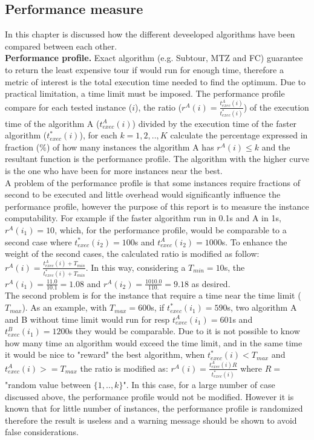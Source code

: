 \documentclass[10pt, english, openany]{report}
\begin{document}
\begin{appendices}
		\chapter{Performance measure} \label{sec:performance_meausure}
			In this chapter is discussed how the different deveeloped algorithms have been compared between each other.\\
			\textbf{Performance profile.} Exact algorithm (e.g. Subtour, MTZ and FC) guarantee to return the least expensive tour if would run for enough time, therefore a metric of interest is the total execution time needed to find the optimum. 
			Due to practical limitation, a time limit must be imposed. The performance profile compare for each tested instance ($ i $), the ratio ($ r^A(i) = \frac{t_{exec}^A(i)}{t_{exec}^*(i)} $) of the execution time of the algorithm A ($ t_{exec}^A(i) $) divided by the execution time of the faster algorithm ($ t_{exec}^*(i) $), for each $ k = 1, 2, .., K $ calculate the percentage expressed in fraction ($ \% $) of how many instances the algorithm A has $ r^A(i) \le k $ and the resultant function is the performance profile.
			The algorithm with the higher curve is the one who have been for more instances near the best.\\
			A problem of the performance profile is that some instances require fractions of second to be executed and little overhead would significantly influence the performance profile, however the purpose of this report is to measure the instance computability. For example if the faster algorithm run in 0.1s and A in 1s, $ r^A(i_1) = 10 $, which, for the performance profile, would be comparable to a second case where $ t_{exec}^*(i_2) = 100 $s and $ t_{exec}^A(i_2) = 1000 $s. To enhance the weight of the second cases, the calculated ratio is modified as follow: $ r^A(i) = \frac{t_{exec}^A(i)+T_{min}}{t_{exec}^*(i)+T_{min}} $. In this way, considering a $ T_{min} = 10$s, the $ r^A(i_1) = \frac{11.0}{10.1} = 1.08 $ and $ r^A(i_2) = \frac{1010.0}{110.} = 9.18 $ as desired.\\
			The second problem is for the instance that require a time near the time limit ($ T_{max} $). As an example, with $ T_{max} = 600 $s, if $ t_{exec}^*(i_1) = 590$s, two algorithm A and B without time limit would run for resp $ t_{exec}^A(i_1) = 601$s and $ t_{exec}^B(i_1) = 1200$s they would be comparable. Due to it is not possible to know how many time an algorithm would exceed the time limit, and in the same time it would be nice to "reward" the best algorithm, when $ t_{exec}^*(i) < T_{max} $ and $ t_{exec}^A(i) >= T_{max} $ the ratio is modified as:  $ r^A(i) = \frac{t_{exec}^A(i)R}{t_{exec}^*(i)} $ where $ R = $ "random value between $ \{1,..,k\} $". In this case, for a large number of case discussed above, the performance profile would not be modified. However it is known that for little number of instances, the performance profile is randomized therefore the result is useless and a warning message should be shown to avoid false considerations.
			

\end{appendices}
\end{document}
